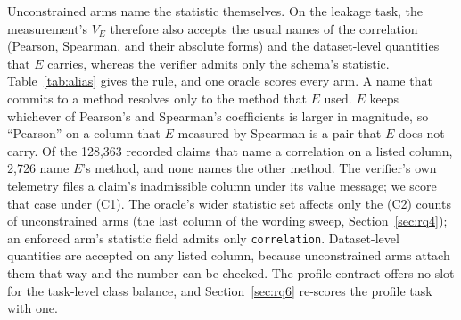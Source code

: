 \documentclass[smallextended,natbib]{svjour3}
\begin{document}
Unconstrained arms name the statistic themselves. On the leakage task, the
measurement's $V_E$ therefore also accepts the usual names of the correlation
(Pearson, Spearman, and their absolute forms) and the dataset-level quantities
that $E$ carries, whereas the verifier admits only the schema's statistic.
Table~\ref{tab:alias} gives the rule, and one oracle scores every arm. A name
that commits to a method resolves only to the method that $E$ used. $E$ keeps
whichever of Pearson's and Spearman's coefficients is larger in magnitude, so
``Pearson'' on a column that $E$ measured by Spearman is a pair that $E$ does
not carry. Of the 128{,}363 recorded claims that name a correlation on a listed
column, 2{,}726 name $E$'s method, and none names the other method. The
verifier's own telemetry files a claim's inadmissible column under its value
message; we score that case under (C1). The oracle's wider statistic set
affects only the (C2) counts of unconstrained arms (the last column of the
wording sweep, Section~\ref{sec:rq4}); an enforced arm's statistic field admits
only \texttt{correlation}. Dataset-level quantities are accepted on any listed
column, because unconstrained arms attach them that way and the number can be
checked. The profile contract offers no slot for the task-level class balance,
and Section~\ref{sec:rq6} re-scores the profile task with one.

\begin{table}[!htbp]
\caption{How the leakage measurement resolves a claim's statistic name, after
lower-casing and turning spaces and hyphens into underscores. The tolerance is
$\tau=0.005$ throughout; the verifier admits only \texttt{correlation}.}
\label{tab:alias}
\centering
\footnotesize
\setlength{\tabcolsep}{3pt}
\end{table}
\end{document}
